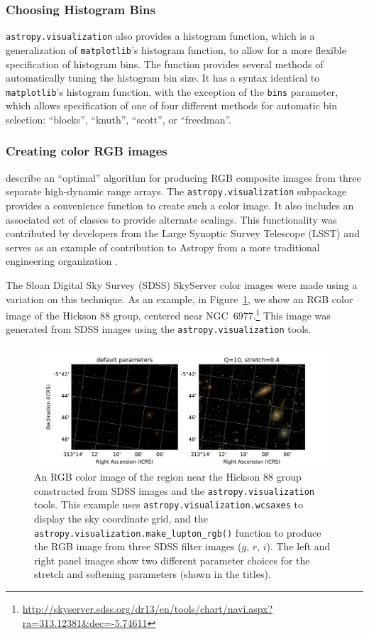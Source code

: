 \documentclass[modern]{aastex61}
\newcommand{\package}[1]{\texttt{#1}\xspace}
\newcommand{\astropy}{Astropy\xspace}
\renewcommand{\figurename}{Figure\xspace}
\begin{document}
\subsubsection{Choosing Histogram Bins}

\package{astropy.visualization} also provides a histogram function, which is a
generalization of \texttt{matplotlib}’s histogram function, to allow for a more
flexible specification of histogram bins.  The function provides several methods
of automatically tuning the histogram bin size. It has a syntax identical to
\texttt{matplotlib}’s histogram function, with the exception of the \texttt{bins}
parameter, which allows specification of one of four different methods for
automatic bin selection: ``blocks'', ``knuth'', ``scott'', or ``freedman''.

\subsubsection{Creating color RGB images}

\cite{Lupton2004} describe an ``optimal'' algorithm for producing
RGB composite images from three separate high-dynamic range
arrays. The \package{astropy.visualization} subpackage provides a convenience
function to create such a color image.  It also includes an associated set of
classes to provide alternate scalings.
This functionality was contributed by developers from the Large Synoptic Survey
Telescope (LSST) and serves as an example of contribution to \astropy from a
more traditional engineering organization \citep{Jennes2016}.

The Sloan Digital Sky Survey (SDSS) SkyServer color images were made using a
variation on this technique.  As an example, in \figurename~\ref{fig:ngc6977},
we show an RGB color image of the Hickson 88 group, centered near
NGC~6977.\footnote{\url{http://skyserver.sdss.org/dr13/en/tools/chart/navi.aspx?ra=313.12381&dec=-5.74611}}
This image was generated from SDSS images using the
\package{astropy.visualization} tools.

\begin{figure}
\includegraphics[width=\textwidth]{ngc6977}
\caption{An RGB color image of the region near the Hickson 88 group
constructed from SDSS images and the \package{astropy.visualization}
tools.
This example uses \package{astropy.visualization.wcsaxes} to display the
sky coordinate grid, and the \texttt{astropy.visualization.make\_lupton\_rgb()}
function to produce the RGB image from three SDSS filter images ($g$, $r$, $i$).
The left and right panel images show two different parameter choices for the
stretch and softening parameters (shown in the titles).
\label{fig:ngc6977}}
\end{figure}
\end{document}
